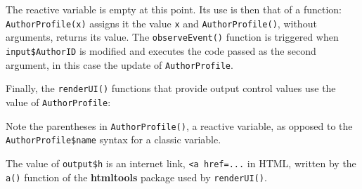 \documentclass[
  12pt,
  american,
  a4paper,
  extrafontsizes,onecolumn,openright
  ]{memoir}
\newenvironment{Shaded}{\begin{snugshade}}{\end{snugshade}}
\newcommand{\AttributeTok}[1]{\textcolor[rgb]{0.77,0.63,0.00}{#1}}
\newcommand{\CommentTok}[1]{\textcolor[rgb]{0.56,0.35,0.01}{\textit{#1}}}
\newcommand{\FunctionTok}[1]{\textcolor[rgb]{0.00,0.00,0.00}{#1}}
\newcommand{\NormalTok}[1]{#1}
\newcommand{\OtherTok}[1]{\textcolor[rgb]{0.56,0.35,0.01}{#1}}
\newcommand{\SpecialCharTok}[1]{\textcolor[rgb]{0.00,0.00,0.00}{#1}}
\newcommand{\StringTok}[1]{\textcolor[rgb]{0.31,0.60,0.02}{#1}}
\begin{document}
\normalsize

The reactive variable is empty at this point.
Its use is then that of a function: \texttt{AuthorProfile(x)} assigns it the value \texttt{x} and \texttt{AuthorProfile()}, without arguments, returns its value.
The \texttt{observeEvent()} function is triggered when \texttt{input\$AuthorID} is modified and executes the code passed as the second argument, in this case the update of \texttt{AuthorProfile}.

\scriptsize

\begin{Shaded}
\end{Shaded}

\normalsize

Finally, the \texttt{renderUI()} functions that provide output control values use the value of \texttt{AuthorProfile}:

\scriptsize

\begin{Shaded}
\end{Shaded}

\normalsize

Note the parentheses in \texttt{AuthorProfile()}, a reactive variable, as opposed to the \texttt{AuthorProfile\$name} syntax for a classic variable.

The value of \texttt{output\$h} is an internet link, \texttt{\textless{}a\ href=...} in HTML, written by the \texttt{a()} function of the \textbf{htmltools} package used by \texttt{renderUI()}.

\scriptsize

\begin{Shaded}
\end{Shaded}
\end{document}
